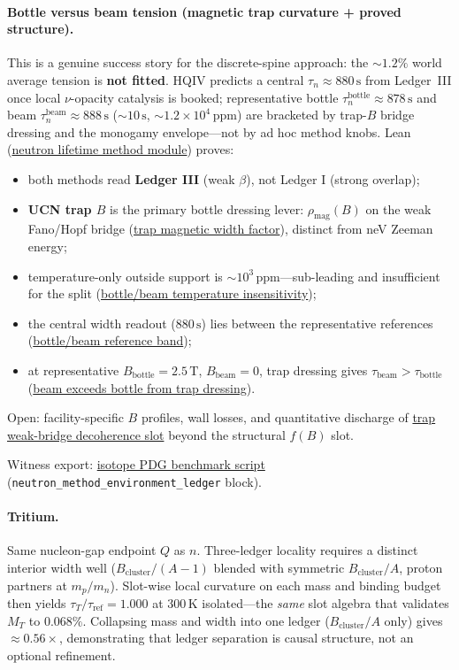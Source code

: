 \documentclass[11pt,notitlepage]{amsart}
\begin{document}
\paragraph{Bottle versus beam tension (magnetic trap curvature + proved structure).}
This is a genuine success story for the discrete-spine approach: the $\sim 1.2\%$ world
average tension is \textbf{not fitted}. HQIV predicts a central $\tau_n\approx 880\,\mathrm{s}$
from Ledger~III once local $\nu$-opacity catalysis is booked; representative bottle
$\tau_n^{\mathrm{bottle}}\approx 878\,\mathrm{s}$ and beam
$\tau_n^{\mathrm{beam}}\approx 888\,\mathrm{s}$ ($\sim 10\,\mathrm{s}$, $\sim 1.2\times 10^4\,\mathrm{ppm}$)
are bracketed by trap-$B$ bridge dressing and the monogamy envelope---not by ad hoc
method knobs. Lean
(\hyperref[lean:neutron-lifetime-method]{neutron lifetime method module}) proves:
\begin{itemize}[leftmargin=2em]
\item both methods read \textbf{Ledger III} (weak $\beta$), not Ledger I (strong overlap);
\item \textbf{UCN trap $B$} is the primary bottle dressing lever:
  $\rho_{\mathrm{mag}}(B)$ on the weak Fano/Hopf bridge
  (\hyperref[lean:neutron-lifetime-method]{trap magnetic width factor}), distinct from neV Zeeman energy;
\item temperature-only outside support is $\sim 10^3\,\mathrm{ppm}$---sub-leading and
  insufficient for the split
  (\hyperref[lean:neutron-lifetime-method]{bottle/beam temperature insensitivity});
\item the central width readout ($880\,\mathrm{s}$) lies between the representative
  references (\hyperref[lean:neutron-lifetime-method]{bottle/beam reference band});
\item at representative $B_{\mathrm{bottle}}=2.5\,\mathrm{T}$, $B_{\mathrm{beam}}=0$,
  trap dressing gives $\tau_{\mathrm{beam}}>\tau_{\mathrm{bottle}}$
  (\hyperref[lean:neutron-lifetime-method]{beam exceeds bottle from trap dressing}).
\end{itemize}
Open: facility-specific $B$ profiles, wall losses, and quantitative discharge of
\hyperref[lean:neutron-lifetime-method]{trap weak-bridge decoherence slot} beyond the structural $f(B)$ slot.

Witness export: \hyperref[app:scripts]{isotope PDG benchmark script}
(\texttt{neutron\_method\_environment\_ledger} block).

\paragraph{Tritium.}
Same nucleon-gap endpoint $Q$ as $n$. Three-ledger locality requires a distinct
interior width well ($B_{\mathrm{cluster}}/(A-1)$ blended with symmetric
$B_{\mathrm{cluster}}/A$, proton partners at $m_p/m_n$). Slot-wise local curvature on
each mass and binding budget then yields $\tau_T/\tau_{\mathrm{ref}}=1.000$ at
$300\,\mathrm{K}$ isolated---the \emph{same} slot algebra that validates $M_T$ to
$0.068\%$. Collapsing mass and width into one ledger ($B_{\mathrm{cluster}}/A$ only)
gives $\approx 0.56\times$, demonstrating that ledger separation is causal structure,
not an optional refinement.
\end{document}
